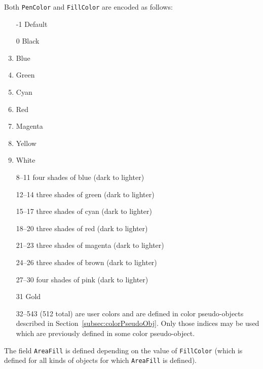 \documentclass[10pt, a4paper]{article}%
\begin{document}
\noindent
Both \texttt{PenColor} and \texttt{FillColor} are encoded as follows: 
%
\begin{enumerate}
\item[-1]    Default
\item[0]     Black
\item        Blue
\item        Green
\item        Cyan
\item        Red
\item        Magenta
\item        Yellow
\item        White
\item[ 8--11] four shades of blue (dark to lighter)
\item[12--14] three shades of green (dark to lighter)
\item[15--17] three shades of cyan (dark to lighter)
\item[18--20] three shades of red (dark to lighter)
\item[21--23] three shades of magenta (dark to lighter)
\item[24--26] three shades of brown (dark to lighter)
\item[27--30] four shades of pink (dark to lighter)
\item[31]    Gold
\item[32--543] (512 total) are user colors and
              are defined in color pseudo-objects 
              described in Section~\ref{subsec:colorPseudoObj}. 
              Only those indices may be used 
              which are previously defined in some color pseudo-object. 
\end{enumerate}

The field \texttt{AreaFill} is defined depending on the value of \texttt{FillColor} 
(which is defined for all kinds of objects 
for which \texttt{AreaFill} is defined). 
\end{document}
